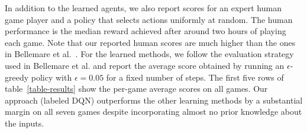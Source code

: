 \documentclass{article} \usepackage{nips13submit_e,times}
\begin{document}
In addition to the learned agents, we also report scores for an expert human game player and a policy that selects actions uniformly at random. The human performance is the median reward achieved after around two hours of playing each game. Note that our reported human scores are much higher than the ones in Bellemare et al.~\cite{bellemare-ale}.  For the learned methods, we follow the evaluation strategy used in Bellemare et al. \cite{bellemare-ale,bellemare:qtf} and report the average score obtained by running an $\epsilon$-greedy policy with $\epsilon=0.05$ for a fixed number of steps. The first five rows of table~\ref{table-results} show the per-game average scores on all games.  Our approach (labeled DQN) outperforms the other learning methods by a substantial margin on all seven games despite incorporating almost no prior knowledge about the inputs.   
\end{document}
